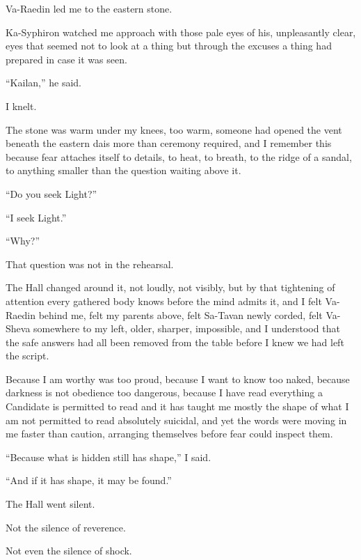Va-Raedin led me to the eastern stone.\par

Ka-Syphiron watched me approach with those pale eyes of his, unpleasantly clear, eyes that seemed 
not to look at a thing but through the excuses a thing had prepared in case it was seen.\par

“Kailan,” he said.\par

I knelt.\par

The stone was warm under my knees, too warm, someone had opened the vent beneath the eastern 
dais more than ceremony required, and I remember this because fear attaches itself to details, 
to heat, to breath, to the ridge of a sandal, to anything smaller than the question waiting above it.\par

“Do you seek Light?”\par

“I seek Light.”\par

“Why?”\par

That question was not in the rehearsal.\par

The Hall changed around it, not loudly, not visibly, but by that tightening of attention every 
gathered body knows before the mind admits it, and I felt Va-Raedin behind me, felt my parents above, 
felt Sa-Tavan newly corded, felt Va-Sheva somewhere to my left, older, sharper, impossible, and I 
understood that the safe answers had all been removed from the table before I knew we had left the script.\par

Because I am worthy was too proud, because I want to know too naked, because darkness is not 
obedience too dangerous, because I have read everything a Candidate is permitted to read and it has 
taught me mostly the shape of what I am not permitted to read absolutely suicidal, and yet the words 
were moving in me faster than caution, arranging themselves before fear could inspect them.\par


“Because what is hidden still has shape,” I said.\par
“And if it has shape, it may be found.”\par
The Hall went silent.\par
Not the silence of reverence.\par
Not even the silence of shock.\par %


